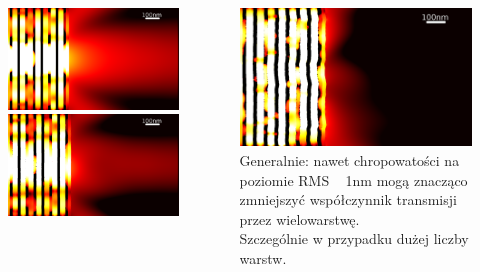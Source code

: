 \documentclass{beamer}
\begin{document}
\begin{frame}[t]
	\begin{columns}
		\begin{column}{0.5\textwidth}
			\begin{figure}
				\includegraphics[width=\textwidth]{../images/multilayer/oer-rms0.png}\\
				\includegraphics[width=\textwidth]{../images/multilayer/oer-rms01.png}\\
			\end{figure}
		\end{column}
		\begin{column}{0.5\textwidth}
				\includegraphics[width=\textwidth]{../images/multilayer/oer-rms05.png}\\
				Generalnie: nawet chropowatości na poziomie RMS ~ 1nm mogą znacząco zmniejszyć współczynnik transmisji przez wielowarstwę. \\
				 Szczególnie w przypadku dużej liczby warstw.
		\end{column}
	

\end{columns}
\end{frame}
\end{document}
